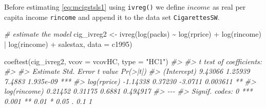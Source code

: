 \documentclass[
  14pt,
]{memoir}
\newenvironment{Shaded}{\begin{snugshade}}{\end{snugshade}}
\newcommand{\AttributeTok}[1]{\textcolor[rgb]{0.77,0.63,0.00}{#1}}
\newcommand{\CommentTok}[1]{\textcolor[rgb]{0.56,0.35,0.01}{\textit{#1}}}
\newcommand{\FunctionTok}[1]{\textcolor[rgb]{0.00,0.00,0.00}{#1}}
\newcommand{\NormalTok}[1]{#1}
\newcommand{\OtherTok}[1]{\textcolor[rgb]{0.56,0.35,0.01}{#1}}
\newcommand{\SpecialCharTok}[1]{\textcolor[rgb]{0.00,0.00,0.00}{#1}}
\newcommand{\StringTok}[1]{\textcolor[rgb]{0.31,0.60,0.02}{#1}}
\begin{document}
Before estimating \eqref{eq:mcigstsls1} using \texttt{ivreg()} we define \(income\) as real per capita income \texttt{rincome} and append it to the data set \texttt{CigarettesSW}.

\begin{Shaded}
\end{Shaded}

\begin{Shaded}
\begin{Highlighting}[]
\CommentTok{\# estimate the model}
\NormalTok{cig\_ivreg2 }\OtherTok{\textless{}{-}} \FunctionTok{ivreg}\NormalTok{(}\FunctionTok{log}\NormalTok{(packs) }\SpecialCharTok{\textasciitilde{}} \FunctionTok{log}\NormalTok{(rprice) }\SpecialCharTok{+} 
                                 \FunctionTok{log}\NormalTok{(rincome) }\SpecialCharTok{|} \FunctionTok{log}\NormalTok{(rincome) }\SpecialCharTok{+} 
\NormalTok{                    salestax, }\AttributeTok{data =}\NormalTok{ c1995)}

\FunctionTok{coeftest}\NormalTok{(cig\_ivreg2, }\AttributeTok{vcov =}\NormalTok{ vcovHC, }\AttributeTok{type =} \StringTok{"HC1"}\NormalTok{)}
\CommentTok{\#\textgreater{} }
\CommentTok{\#\textgreater{} t test of coefficients:}
\CommentTok{\#\textgreater{} }
\CommentTok{\#\textgreater{}              Estimate Std. Error t value  Pr(\textgreater{}|t|)    }
\CommentTok{\#\textgreater{} (Intercept)   9.43066    1.25939  7.4883 1.935e{-}09 ***}
\CommentTok{\#\textgreater{} log(rprice)  {-}1.14338    0.37230 {-}3.0711  0.003611 ** }
\CommentTok{\#\textgreater{} log(rincome)  0.21452    0.31175  0.6881  0.494917    }
\CommentTok{\#\textgreater{} {-}{-}{-}}
\CommentTok{\#\textgreater{} Signif. codes:  0 \textquotesingle{}***\textquotesingle{} 0.001 \textquotesingle{}**\textquotesingle{} 0.01 \textquotesingle{}*\textquotesingle{} 0.05 \textquotesingle{}.\textquotesingle{} 0.1 \textquotesingle{} \textquotesingle{} 1}
\end{Highlighting}
\end{Shaded}
\end{document}
